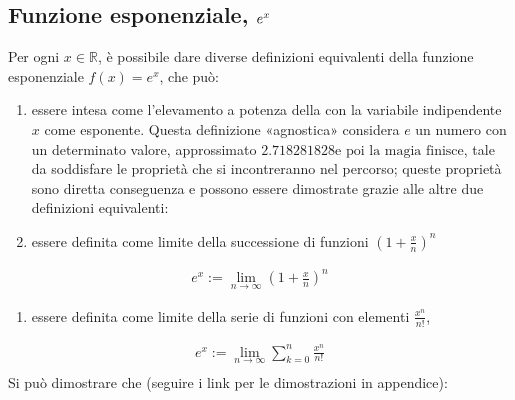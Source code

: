 \documentclass[letterpaper,10pt,italian]{jupyterBook}
\begin{document}
\subsection{Funzione esponenziale, \protect\(e^x\protect\)}
\label{\detokenize{ch/precalculus/exponential_logarithm:funzione-esponenziale-e-x}}\label{\detokenize{ch/precalculus/exponential_logarithm:math-hs-exp-def}}
\sphinxAtStartPar
{} Per ogni \(x \in \mathbb{R}\), è possibile dare diverse definizioni equivalenti della funzione esponenziale \(f(x) = e^x\), che può:
\begin{enumerate}
%
\item {} 
\sphinxAtStartPar
essere intesa come l’elevamento a potenza della {\hyperref[\detokenize{ch/series:math-hs-series-e-euler}]{}} con la variabile indipendente \(x\) come esponente. Questa definizione «agnostica» considera \(e\) un numero con un determinato valore, approssimato \(2.718281828\text{e poi la magia finisce}\), tale da soddisfare le proprietà che si incontreranno nel percorso; queste proprietà sono diretta conseguenza e possono essere dimostrate grazie alle altre due definizioni equivalenti:

\item {} 
\sphinxAtStartPar
essere definita come limite della successione di funzioni \(\left( 1 + \frac{x}{n} \right)^n\)

\end{enumerate}
\begin{equation*}
\begin{split}
  e^x := \lim_{n \rightarrow \infty} \left( 1 + \frac{x}{n}\right)^n
\end{split}
\end{equation*}\begin{enumerate}
%
\setcounter{enumi}{2}
\item {} 
\sphinxAtStartPar
essere definita come limite della serie di funzioni con elementi \(\frac{x^n}{n!}\),

\end{enumerate}
\begin{equation*}
\begin{split}
  e^x := \lim_{n \rightarrow \infty} \sum_{k=0}^{n} \frac{x^n}{n!} \\
\end{split}
\end{equation*}
\sphinxAtStartPar
Si può dimostrare che (seguire i link per le dimostrazioni in appendice):
\end{document}
